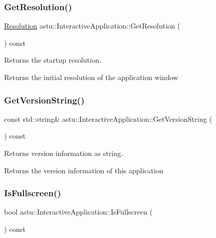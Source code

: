 \subsubsection{\texorpdfstring{Get\+Resolution()}{GetResolution()}}
{\footnotesize\ttfamily \hyperlink{group__srv__group_ga68a91c7015964dbdea802829ae5ccb3c}{Resolution} astu\+::\+Interactive\+Application\+::\+Get\+Resolution (\begin{DoxyParamCaption}{ }\end{DoxyParamCaption}) const}

Returns the startup resolution.

\begin{DoxyReturn}{Returns}
the initial resolution of the application window 
\end{DoxyReturn}
\mbox{\label{classastu_1_1InteractiveApplication_abb28b2c9cb4ca1de16019c0a762a48bc}} 
\subsubsection{\texorpdfstring{Get\+Version\+String()}{GetVersionString()}}
{\footnotesize\ttfamily const std\+::string\& astu\+::\+Interactive\+Application\+::\+Get\+Version\+String (\begin{DoxyParamCaption}{ }\end{DoxyParamCaption}) const}

Returns version information as string.

\begin{DoxyReturn}{Returns}
the version information of this application 
\end{DoxyReturn}
\mbox{\label{classastu_1_1InteractiveApplication_a3f8e72fa951185e7b91508770c84f12c}} 
\subsubsection{\texorpdfstring{Is\+Fullscreen()}{IsFullscreen()}}
{\footnotesize\ttfamily bool astu\+::\+Interactive\+Application\+::\+Is\+Fullscreen (\begin{DoxyParamCaption}{ }\end{DoxyParamCaption}) const}

